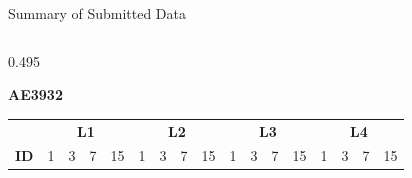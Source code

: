 
\begin{frame}{\small  Summary of Submitted Data}
\tiny

\centering

\begin{columns}[T,onlytextwidth]

\begin{column}{0.495\textwidth}
\centering

\textbf{AE3932}

\vspace{0.05cm}

\renewcommand{\arraystretch}{1.10}
\setlength{\tabcolsep}{1.05pt}

\begin{tabular}{c|cccc|cccc|cccc|cccc}
\toprule
&
\multicolumn{4}{c|}{\textbf{L1}} &
\multicolumn{4}{c|}{\textbf{L2}} &
\multicolumn{4}{c|}{\textbf{L3}} &
\multicolumn{4}{c}{\textbf{L4}} \\

\textbf{ID}
& 1 & 3 & 7 & 15
& 1 & 3 & 7 & 15
& 1 & 3 & 7 & 15
& 1 & 3 & 7 & 15 \\
\midrule


\end{tabular}
\end{column}
\end{columns}
\end{frame}
